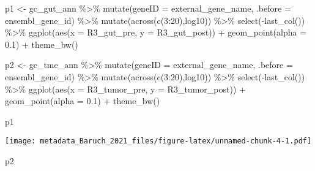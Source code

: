 \documentclass[
]{article}
\newenvironment{Shaded}{\begin{snugshade}}{\end{snugshade}}
\newcommand{\AttributeTok}[1]{\textcolor[rgb]{0.77,0.63,0.00}{#1}}
\newcommand{\DecValTok}[1]{\textcolor[rgb]{0.00,0.00,0.81}{#1}}
\newcommand{\FloatTok}[1]{\textcolor[rgb]{0.00,0.00,0.81}{#1}}
\newcommand{\FunctionTok}[1]{\textcolor[rgb]{0.00,0.00,0.00}{#1}}
\newcommand{\NormalTok}[1]{#1}
\newcommand{\OtherTok}[1]{\textcolor[rgb]{0.56,0.35,0.01}{#1}}
\newcommand{\SpecialCharTok}[1]{\textcolor[rgb]{0.00,0.00,0.00}{#1}}
\begin{document}
\begin{Shaded}
\begin{Highlighting}[]
\NormalTok{p1 }\OtherTok{\textless{}{-}}\NormalTok{ gc\_gut\_ann }\SpecialCharTok{\%\textgreater{}\%}
  \FunctionTok{mutate}\NormalTok{(}\AttributeTok{geneID =}\NormalTok{ external\_gene\_name, }\AttributeTok{.before =}\NormalTok{  ensembl\_gene\_id) }\SpecialCharTok{\%\textgreater{}\%}
  \FunctionTok{mutate}\NormalTok{(}\FunctionTok{across}\NormalTok{(}\FunctionTok{c}\NormalTok{(}\DecValTok{3}\SpecialCharTok{:}\DecValTok{20}\NormalTok{),log10)) }\SpecialCharTok{\%\textgreater{}\%}
  \FunctionTok{select}\NormalTok{(}\SpecialCharTok{{-}}\FunctionTok{last\_col}\NormalTok{()) }\SpecialCharTok{\%\textgreater{}\%}
  \FunctionTok{ggplot}\NormalTok{(}\FunctionTok{aes}\NormalTok{(}\AttributeTok{x =}\NormalTok{ R3\_gut\_pre, }\AttributeTok{y =}\NormalTok{ R3\_gut\_post)) }\SpecialCharTok{+} 
  \FunctionTok{geom\_point}\NormalTok{(}\AttributeTok{alpha =} \FloatTok{0.1}\NormalTok{) }\SpecialCharTok{+}
  \FunctionTok{theme\_bw}\NormalTok{()}

\NormalTok{p2 }\OtherTok{\textless{}{-}}\NormalTok{ gc\_tme\_ann }\SpecialCharTok{\%\textgreater{}\%}
  \FunctionTok{mutate}\NormalTok{(}\AttributeTok{geneID =}\NormalTok{ external\_gene\_name, }\AttributeTok{.before =}\NormalTok{  ensembl\_gene\_id) }\SpecialCharTok{\%\textgreater{}\%}
  \FunctionTok{mutate}\NormalTok{(}\FunctionTok{across}\NormalTok{(}\FunctionTok{c}\NormalTok{(}\DecValTok{3}\SpecialCharTok{:}\DecValTok{20}\NormalTok{),log10)) }\SpecialCharTok{\%\textgreater{}\%}
  \FunctionTok{select}\NormalTok{(}\SpecialCharTok{{-}}\FunctionTok{last\_col}\NormalTok{()) }\SpecialCharTok{\%\textgreater{}\%}
  \FunctionTok{ggplot}\NormalTok{(}\FunctionTok{aes}\NormalTok{(}\AttributeTok{x =}\NormalTok{ R3\_tumor\_pre, }\AttributeTok{y =}\NormalTok{ R3\_tumor\_post)) }\SpecialCharTok{+} 
  \FunctionTok{geom\_point}\NormalTok{(}\AttributeTok{alpha =} \FloatTok{0.1}\NormalTok{) }\SpecialCharTok{+}
  \FunctionTok{theme\_bw}\NormalTok{()}

\NormalTok{p1}
\end{Highlighting}
\end{Shaded}

\texttt{[image: metadata\_Baruch\_2021\_files/figure-latex/unnamed-chunk-4-1.pdf]}

\begin{Shaded}
\begin{Highlighting}[]
\NormalTok{p2}
\end{Highlighting}
\end{Shaded}
\end{document}
